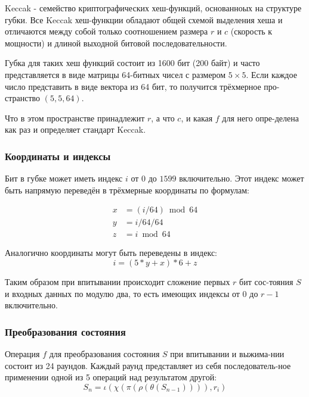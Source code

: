 \documentclass[a4paper]{article}
\begin{document}
  Keccak - семейство криптографических хеш-функций, основанноых на структуре губки.
  Все Keccak хеш-функции обладают общей схемой выделения хеша и отличаются между
  собой только соотношением размера $r$ и $c$ (скорость к мощности) и длиной
  выходной битовой последовательности.

  Губка для таких хеш функций состоит из 1600 бит (200 байт) и часто представляется
  в виде матрицы 64-битных чисел с размером $5\times 5$. Если каждое число представить
  в виде вектора из 64 бит, то получится трёхмерное про-странство $\left(5, 5, 64\right)$.

  Что в этом пространстве принадлежит $r$, а что $c$, и какая $f$ для него опре-делена
  как раз и определяет стандарт Keccak.

  \subsubsection{Координаты и индексы}

  Бит в губке может иметь индекс $i$ от $0$ до $1599$ включительно. Этот индекс
  может быть напрямую переведён в трёхмерные координаты по формулам:

  \begin{align}
    x &= (i / 64) \bmod 64 \\
    y &= i / 64 / 64 \\
    z &= i \bmod 64
  \end{align}

  Аналогично координаты могут быть переведены в индекс:
  \begin{equation}
    i = (5 * y + x) * 6 + z
  \end{equation}

  Таким образом при впитывании происходит сложение первых $r$ бит
  сос-тояния $S$ и входных данных по модулю два, то есть имеющих
  индексы от $0$ до $r - 1$ включительно.

  \subsubsection{Преобразования состояния}

  Операция $f$ для преобразования состояния $S$ при впитывании и выжима-нии
  состоит из 24 раундов. Каждый раунд представляет из себя
  последователь-ное применении одной из 5 операций над результатом другой:
  \begin{equation}
    S_n = \iota(\chi(\pi(\rho(\theta(S_{n - 1})))), r_i)
  \end{equation}
\end{document}
